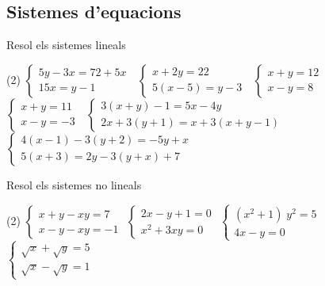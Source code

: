\subsection{Sistemes d'equacions}
\begin{mylist}
\exer[1] Resol els sistemes lineals
\begin{tasks}(2)
	\task $\left\{\begin{array}{l} {5y-3x=72+5x} \\ {15x=y-1} \end{array}\right. \; $    
	\task  $\left\{\begin{array}{l} {x+2y=22} \\ {5(x-5)=y-3} \end{array}\right. \; $  
	\task  $\left\{\begin{array}{l} {x+y=12} \\ {x-y=8} \end{array}\right. \; $      
	\task  $\left\{\begin{array}{l} {x+y=11} \\ {x-y=-3} \end{array}\right. \; $  
	\task $\left\{\begin{array}{l} {3(x+y)-1=5x-4y} \\ {2x+3(y+1)=x+3(x+y-1)} \end{array}\right. \; $  
	\task  $\left\{\begin{array}{l} {4(x-1)-3(y+2)=-5y+x} \\ {5(x+3)=2y-3(y+x)+7} \end{array}\right. \; $
\end{tasks}
\answers[cols=2]{[
		 $x=1; y=16$,      $x=6; y=8$,      $x=10; y=2$,      $x=4; y=7$,     $x=3; y=1$,     $x=-2; y=8$
]}
 
\exer Resol els sistemes no lineals
\begin{tasks}(2)
\task  $\left\{\begin{array}{l} {x+y-xy=7} \\ {x-y-xy=-1} \end{array}\right. $       
\task  $\left\{\begin{array}{l} {2x-y+1=0} \\ {x^{2} +3xy=0} \end{array}\right. $ 
\task  $\left\{\begin{array}{l} {(x^{2} +1)\; y^{2} =5} \\ {4x-y=0} \end{array}\right. $             
\task  $\left\{\begin{array}{l} {\sqrt{x} +\sqrt{y} =5} \\ {\sqrt{x} -\sqrt{y} =1} \end{array}\right. $ 
\end{tasks}
\answers[cols=1]{[ $x=-1; y=4$,     $x=-\dfrac{3}{7}; y=\dfrac{1}{7}$ i $x=0; y=1$,     $x=-\dfrac{1}{2}; y=-2$ i $x=\dfrac{1}{2}; y=2$,     $x=9; y=4$    ]}

\end{mylist}

